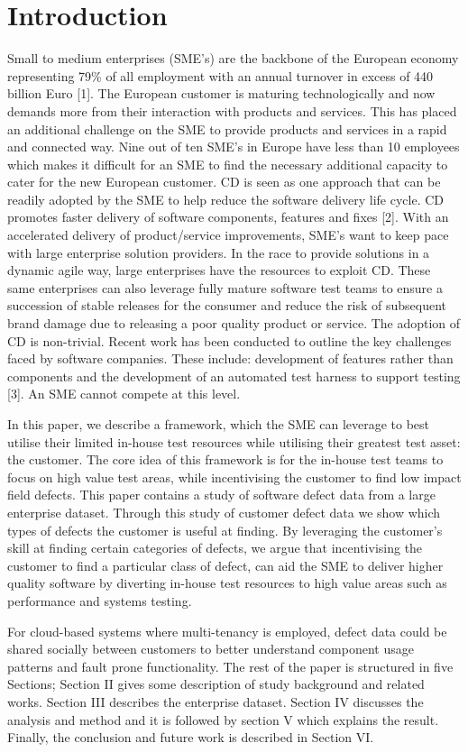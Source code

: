 \documentclass[conference]{IEEEtran}
\begin{document}
\section{Introduction}
Small to medium enterprises (SME's) are the backbone of the European economy representing 79\% of all employment with an annual turnover in excess of 440 billion Euro [1]. The European customer is maturing technologically and now demands more from their interaction with products and services. This has placed an additional challenge on the SME to provide products and services in a rapid and connected way. Nine out of ten SME's in Europe have less than 10 employees which makes it difficult for an SME to find the necessary additional capacity to cater for the new European customer.  CD is seen as one approach that can be readily adopted by the SME to help reduce the software delivery life cycle. CD promotes faster delivery of software components, features and fixes [2]. With an accelerated delivery of product/service improvements, SME's want to keep pace with large enterprise solution providers.  In the race to provide solutions in a dynamic agile way, large enterprises have the resources to exploit CD. These same enterprises can also leverage fully mature software test teams to ensure a succession of stable releases for the consumer and reduce the risk of subsequent brand damage due to releasing a poor quality product or service. The adoption of CD is non-trivial.  Recent work has been conducted to outline the key challenges faced by software companies. These include: development of features rather than components and the development of an automated test harness to support testing [3]. An SME cannot compete at this level. \par
In this paper, we describe a framework, which the SME can leverage to best utilise their limited in-house test resources while utilising their greatest test asset: the customer. The core idea of this framework is for the in-house test teams to focus on high value test areas, while incentivising the customer to find   low impact field defects. This paper contains a study of software defect data from a large enterprise dataset. Through this study of customer defect data we show which types of defects the customer is useful at finding. By leveraging the customer's skill at finding certain categories of defects, we argue that incentivising the customer to find a particular class of defect, can aid the SME to deliver higher quality software by diverting in-house test resources to high value areas such as performance and systems testing.  \par
For cloud-based systems where multi-tenancy is employed, defect data could be shared socially between customers to better understand component usage patterns and fault prone functionality. The rest of the paper is structured in five Sections; Section II gives some description of study background and related works. Section III describes the enterprise dataset. Section IV discusses the analysis and method and it is followed by section V which explains the result. Finally, the conclusion and future work is described in Section VI.
\end{document}
